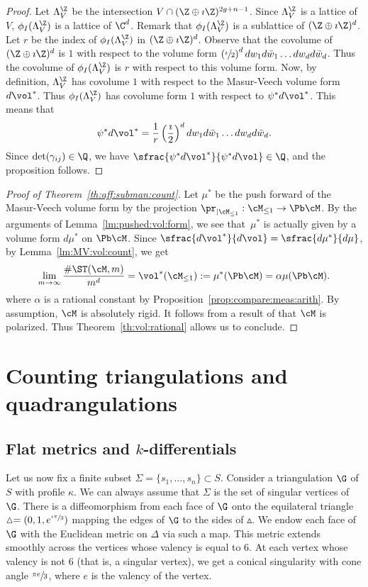 \begin{proof}
Let $\Lambda^\Z_V$ be the intersection $V\cap(\Z\oplus\imath\Z)^{2g+n-1}$. Since $\Lambda^\Z_V$ is a lattice of $V$, $\phi_I(\Lambda^\Z_V)$ is a lattice of $\C^d$. Remark that $\phi_I(\Lambda^\Z_V)$ is a sublattice of $(\Z\oplus\imath\Z)^d$. Let $r$ be the index of $\phi_I(\Lambda^\Z_V)$ in $(\Z\oplus\imath\Z)^d$. Observe that the covolume of $(\Z\oplus\imath\Z)^d$ is $1$ with respect to the volume form $\left(\sfrac{\imath}{2}\right)^ddw_1d\bar{w}_1\dots dw_d d\bar{w}_d$. Thus the covolume of $\phi_I(\Lambda^\Z_V)$ is $r$ with respect to this volume form.
Now, by definition, $\Lambda^\Z_V$ has covolume $1$ with respect to the Masur-Veech volume form $d\vol^*$. Thus $\phi_I(\Lambda^\Z_V)$ has covolume form $1$ with respect to $\psi^*d\vol^*$. This means that
\[
\psi^*d\vol^*=\frac{1}{r}\left(\frac{\imath}{2}\right)^ddw_1d\bar{w}_1\dots dw_d d\bar{w}_d.
\]
Since $\det(\gamma_{ij}) \in \Q$, we have $\sfrac{\psi^*d\vol^*}{\psi^*d\vol} \in \Q$, and the proposition follows.
\end{proof}

\begin{proof}[Proof of Theorem~\ref{th:aff:subman:count}]
Let $\mu^*$ be the push forward of the Masur-Veech volume form by the projection $\pr_{|\cM_{\leq 1}}: \cM_{\leq 1} \to \Pb\cM$.
By the arguments of Lemma~\ref{lm:pushed:vol:form}, we see that~$\mu^*$ is actually given by a volume form $d\mu^*$ on $\Pb\cM$.
Since $\sfrac{d\vol^*}{d\vol}=\sfrac{d\mu^*}{d\mu}$, by Lemma~\ref{lm:MV:vol:count}, we get
\[
\lim_{m\to \infty}\frac{\#\ST(\cM,m)}{m^d}=\vol^*(\cM_{\leq1}):=\mu^*(\Pb\cM)=\alpha\mu(\Pb\cM).
\]
where $\alpha$ is a rational constant by Proposition~\ref{prop:compare:meas:arith}. By assumption, $\cM$ is absolutely rigid. It follows from a result of \cite{AEM17} that $\cM$ is polarized. Thus Theorem~\ref{th:vol:rational} allows us to conclude.
\end{proof}

\section{Counting triangulations and quadrangulations}\label{sec:count:tiling}
\subsection{Flat metrics and $k$-differentials}\label{sec:flat:kdiff}
Let us now fix a finite subset $\Sigma=\{s_1,\dots,s_n\} \subset S$. Consider a triangulation $\G$ of $S$ with profile $\kappa$. We can always assume that $\Sigma$ is the set of singular vertices of $\G$.
There is a diffeomorphism from each face of $\G$ onto the equilateral triangle $\vartriangle=(0,1,e^{\sfrac{\imath\pi}{3}})$ mapping the edges of $\G$ to the sides of $\vartriangle$.
We endow each face of $\G$ with the Euclidean metric on $\Delta$ via such a map.
This metric extends smoothly across the vertices whose valency is equal to $6$.
At each vertex whose valency is not $6$ (that is, a singular vertex), we get a conical singularity with cone angle $\sfrac{\pi e}{3}$, where $e$ is the valency of the vertex.


